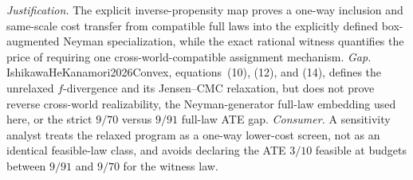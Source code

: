 \documentclass{article}
\begin{document}
\par\smallskip\noindent \textit{Justification.} The explicit inverse-propensity map proves a one-way inclusion and same-scale cost transfer from compatible full laws into the explicitly defined box-augmented Neyman specialization, while the exact rational witness quantifies the price of requiring one cross-world-compatible assignment mechanism. \textit{Gap.} IshikawaHeKanamori2026Convex, equations~(10), (12), and (14), defines the unrelaxed \(f\)-divergence and its Jensen--CMC relaxation, but does not prove reverse cross-world realizability, the Neyman-generator full-law embedding used here, or the strict \(9/70\) versus \(9/91\) full-law ATE gap. \textit{Consumer.} A sensitivity analyst treats the relaxed program as a one-way lower-cost screen, not as an identical feasible-law class, and avoids declaring the ATE \(3/10\) feasible at budgets between \(9/91\) and \(9/70\) for the witness law.
\end{document}
